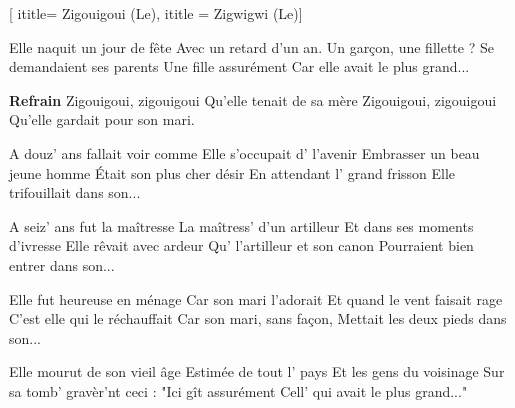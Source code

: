  [
ititle= {Zigouigoui (Le)},
ititle = {Zigwigwi (Le)}]

\beginverse
Elle naquit un jour de fête
Avec un retard d'un an.
Un garçon, une fillette ?
Se demandaient ses parents
Une fille assurément
Car elle avait le plus grand...
\endverse

\beginchorus
\textbf {Refrain}
Zigouigoui, zigouigoui
Qu'elle tenait de sa mère
Zigouigoui, zigouigoui
Qu'elle gardait pour son mari.
\endchorus

\beginverse
A douz' ans fallait voir comme
Elle s'occupait d' l'avenir
Embrasser un beau jeune homme
Était son plus cher désir
En attendant l' grand frisson
Elle trifouillait dans son...
\endverse

\beginverse
A seiz' ans fut la maîtresse
La maîtress' d'un artilleur
Et dans ses moments d'ivresse
Elle rêvait avec ardeur
Qu' l'artilleur et son canon
Pourraient bien entrer dans son...
\endverse

\beginverse
Elle fut heureuse en ménage
Car son mari l'adorait
Et quand le vent faisait rage
C'est elle qui le réchauffait
Car son mari, sans façon,
Mettait les deux pieds dans son...
\endverse

\beginverse
Elle mourut de son vieil âge
Estimée de tout l' pays
Et les gens du voisinage
Sur sa tomb' gravèr'nt ceci :
"Ici gît assurément
Cell' qui avait le plus grand..."
\endverse

\endsong